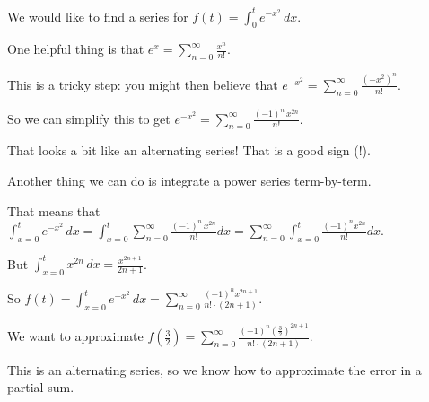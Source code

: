 \documentclass{ximera}
\begin{document}
\begin{question}
\begin{solution}
  \begin{hint}
    We would like to find a series for \(f(t) = \displaystyle\int_0^t e^{-x^2} \, dx\).
  \end{hint}
  \begin{hint}
    One helpful thing is that \(e^x = \displaystyle\sum_{n=0}^\infty \displaystyle\frac{x^n}{n!}\).
  \end{hint}
  \begin{hint}
    This is a tricky step: you might then believe that \(e^{-x^2} = \displaystyle\sum_{n=0}^\infty \displaystyle\frac{\left(-x^2\right)^n}{n!}\).
  \end{hint}
  \begin{hint}
    So we can simplify this to get \(e^{-x^2} = \displaystyle\sum_{n=0}^\infty \displaystyle\frac{(-1)^n \, x^{2n}}{n!}\).
  \end{hint}
  \begin{hint}
    That looks a bit like an alternating series!  That is a good sign (!).
  \end{hint}
  \begin{hint}
    Another thing we can do is integrate a power series term-by-term.
  \end{hint}
  \begin{hint}
    That means that \(\displaystyle\int_{x=0}^t e^{-x^2} \, dx = \displaystyle\int_{x=0}^t \displaystyle\sum_{n=0}^\infty \displaystyle\frac{(-1)^n \, x^{2n}}{n!} dx = \displaystyle\sum_{n=0}^\infty \displaystyle\int_{x=0}^t \displaystyle\frac{(-1)^n x^{2n}}{n!} dx\).
  \end{hint}
  \begin{hint}
    But \(\displaystyle\int_{x=0}^t x^{2n} \, dx = \displaystyle\frac{x^{2n+1}}{2n+1}\).
  \end{hint}
  \begin{hint}
    So \(f(t) = \displaystyle\int_{x=0}^t e^{-x^2} \, dx = \displaystyle\sum_{n=0}^\infty \displaystyle\frac{(-1)^n x^{2n+1}}{n! \cdot (2n+1)}\).
  \end{hint}
  \begin{hint}
    We want to approximate \(f\left(\displaystyle\frac{3}{2}\right) = \displaystyle\sum_{n=0}^\infty \displaystyle\frac{(-1)^n \left(\displaystyle\frac{3}{2}\right)^{2n+1}}{n! \cdot (2n+1)}\).
  \end{hint}
  \begin{hint}
    This is an alternating series, so we know how to approximate the error in a partial sum.
  \end{hint}

\end{solution}
\end{question}
\end{document}
